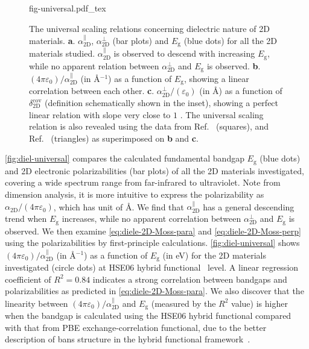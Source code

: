 \begin{figure}[!htbp]
\centering
{fig-universal.pdf_tex}
\caption{\label{fig:diel-universal} The universal scaling relations
  concerning dielectric nature of 2D materials.
  \textbf{a}. $\alpha_{\mathrm{2D}}^{\parallel}$,
  $\alpha_{\mathrm{2D}}^{\perp}$ (bar plots) and $E_{\mathrm{g}}$
  (blue dots) for all the 2D materials studied.
  $\alpha_{\mathrm{2D}}^{\parallel}$ is observed to descend with
  increasing $E_{\mathrm{g}}$, while no apparent relation between
  $\alpha_{\mathrm{2D}}^{\perp}$ and $E_{\mathrm{g}}$ is
  observed. \textbf{b}.
  $(4\pi \varepsilon_{0})/\alpha_{\mathrm{2D}}^{\parallel}$ (in
  \AA{}$^{-1}$) as a function of $E_{\mathrm{g}}$, showing a linear
  correlation between each other.  \textbf{c}.
  $\alpha_{\mathrm{2D}}^{\perp}/(\varepsilon_{0})$ (in \AA{}) as a
  function of $\delta_{\mathrm{2D}}^{\mathrm{cov}}$ (definition schematically shown
  in the inset), showing a perfect linear relation with slope very
  close to $1$ . The universal scaling relation is also revealed using
  the data from Ref.~\cite{Haastrup_2018_database} (squares), and
  Ref.~\cite{Mounet_2018_database} (triangles) as superimposed on
  \textbf{b} and \textbf{c}.  }
\end{figure}
\autoref{fig:diel-universal} compares the calculated fundamental bandgap
$E_{\mathrm{g}}$ (blue dots) and 2D electronic polarizabilities (bar
plots) of all the 2D materials investigated, covering a wide spectrum
range from far-infrared to ultraviolet.  Note from dimension analysis,
it is more intuitive to express the polarizability as
$\alpha_{\mathrm{2D}}/(4 \pi \varepsilon_{0})$, which has unit of
\AA{}. We find that $\alpha_{\mathrm{2D}}^{\parallel}$ has a general
descending trend when $E_{\mathrm{g}}$ increases, while no apparent
correlation between $\alpha_{\mathrm{2D}}^{\perp}$ and
$E_{\mathrm{g}}$ is observed.
%
We then examine \autoref{eq:diele-2D-Moss-para} and
\autoref{eq:diele-2D-Moss-perp} using the polarizabilities by
first-principle calculations.  \autoref{fig:diel-universal}
shows $(4 \pi \varepsilon_{0})/\alpha_{\mathrm{2D}}^{\parallel}$ (in
\AA{}$^{-1}$) as a function of $E_{\mathrm{g}}$ (in eV) for the 2D
materials investigated (circle dots) at HSE06 hybrid
functional~\autocite{Heyd_2003_HSe,HSE_2006_erratum} level.  A linear
regression coefficient of $R^{2}=0.84$ indicates a strong correlation
between bandgaps and polarizabilities as predicted in
\autoref{eq:diele-2D-Moss-para}.  We also discover that the linearity
between $(4 \pi \varepsilon_{0})/\alpha_{\mathrm{2D}}^{\parallel}$ and
$E_{\mathrm{g}}$ (measured by the $R^{2}$ value) is higher when the
bandgap is calculated using the HSE06 hybrid functional compared with
that from PBE exchange-correlation functional, due to the better
description of bans structure in the hybrid functional
framework~\autocite{Heyd_2005_HSE_GAP}.



